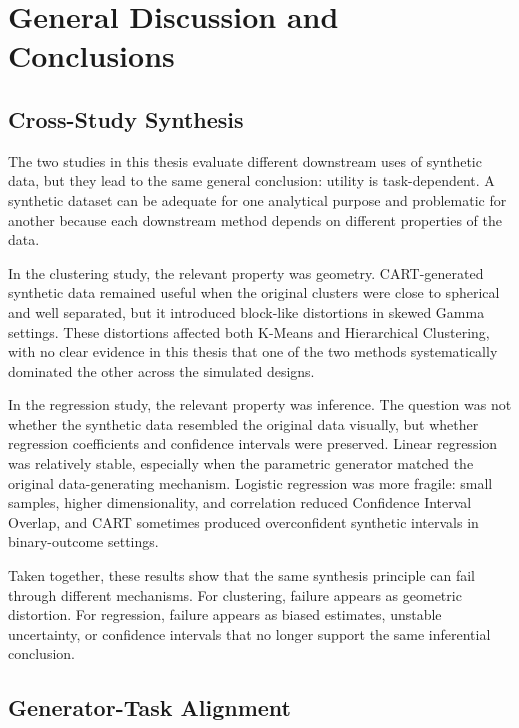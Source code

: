 \chapter{General Discussion and Conclusions}
\label{chap:general-conclusions}

\section{Cross-Study Synthesis}
\label{sec:general-cross-study-synthesis}

The two studies in this thesis evaluate different downstream uses of synthetic data, but they lead to the same general conclusion: utility is task-dependent. A synthetic dataset can be adequate for one analytical purpose and problematic for another because each downstream method depends on different properties of the data.

In the clustering study, the relevant property was geometry. CART-generated synthetic data remained useful when the original clusters were close to spherical and well separated, but it introduced block-like distortions in skewed Gamma settings. These distortions affected both K-Means and Hierarchical Clustering, with no clear evidence in this thesis that one of the two methods systematically dominated the other across the simulated designs.

In the regression study, the relevant property was inference. The question was not whether the synthetic data resembled the original data visually, but whether regression coefficients and confidence intervals were preserved. Linear regression was relatively stable, especially when the parametric generator matched the original data-generating mechanism. Logistic regression was more fragile: small samples, higher dimensionality, and correlation reduced Confidence Interval Overlap, and CART sometimes produced overconfident synthetic intervals in binary-outcome settings.

Taken together, these results show that the same synthesis principle can fail through different mechanisms. For clustering, failure appears as geometric distortion. For regression, failure appears as biased estimates, unstable uncertainty, or confidence intervals that no longer support the same inferential conclusion.

\section{Generator-Task Alignment}
\label{sec:generator-task-alignment}

